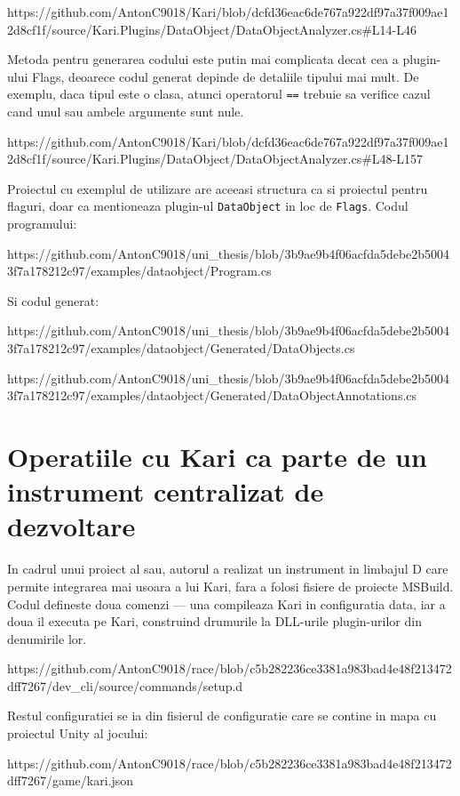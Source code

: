 \documentclass{report}
\begin{document}
https://github.com/AntonC9018/Kari/blob/dcfd36eac6de767a922df97a37f009ae12d8cf1f/source/Kari.Plugins/DataObject/DataObjectAnalyzer.cs\#L14-L46

Metoda pentru generarea codului este putin mai complicata decat cea a
plugin-ului Flags, deoarece codul generat depinde de detaliile tipului
mai mult. De exemplu, daca tipul este o clasa, atunci operatorul
\texttt{==} trebuie sa verifice cazul cand unul sau ambele argumente
sunt nule.

https://github.com/AntonC9018/Kari/blob/dcfd36eac6de767a922df97a37f009ae12d8cf1f/source/Kari.Plugins/DataObject/DataObjectAnalyzer.cs\#L48-L157

Proiectul cu exemplul de utilizare are aceeasi structura ca si proiectul
pentru flaguri, doar ca mentioneaza plugin-ul \texttt{DataObject} in loc
de \texttt{Flags}. Codul programului:

https://github.com/AntonC9018/uni\_thesis/blob/3b9ae9b4f06acfda5debe2b50043f7a178212c97/examples/dataobject/Program.cs

Si codul generat:

https://github.com/AntonC9018/uni\_thesis/blob/3b9ae9b4f06acfda5debe2b50043f7a178212c97/examples/dataobject/Generated/DataObjects.cs

https://github.com/AntonC9018/uni\_thesis/blob/3b9ae9b4f06acfda5debe2b50043f7a178212c97/examples/dataobject/Generated/DataObjectAnnotations.cs

\section{Operatiile cu Kari ca parte de un instrument centralizat de dezvoltare}

In cadrul unui proiect al sau, autorul a realizat un instrument in
limbajul D care permite integrarea mai usoara a lui Kari, fara a folosi
fisiere de proiecte MSBuild. Codul defineste doua comenzi --- una
compileaza Kari in configuratia data, iar a doua il executa pe Kari,
construind drumurile la DLL-urile plugin-urilor din denumirile lor.

https://github.com/AntonC9018/race/blob/c5b282236ce3381a983bad4e48f213472dff7267/dev\_cli/source/commands/setup.d

Restul configuratiei se ia din fisierul de configuratie care se contine
in mapa cu proiectul Unity al jocului:

https://github.com/AntonC9018/race/blob/c5b282236ce3381a983bad4e48f213472dff7267/game/kari.json
\end{document}
